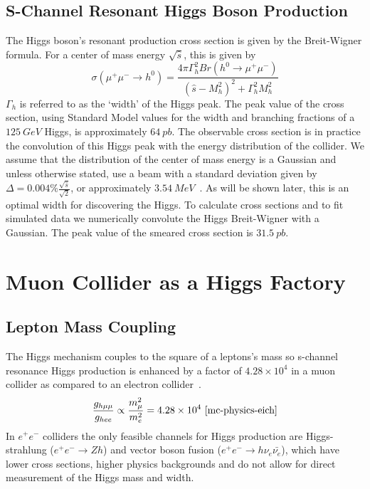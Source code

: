 \documentclass[a4paper]{article}
\begin{document}
\subsection{S-Channel Resonant Higgs Boson Production}
The Higgs boson's resonant production cross section is given by the Breit-Wigner formula. For a center of mass energy $\sqrt{\hat{s}}$, this is given by~\cite{han-higgs-measurement}
\begin{equation}
	\sigma(\mu^+\mu^- \rightarrow h^0) = \frac{4\pi \Gamma_h^2 Br(h^0\rightarrow \mu^+\mu^-)}{{(\hat{s} - M_h^2)}^2 + \Gamma_h^2 M_h^2}\label{eq:higgs-bw}
\end{equation}
$\Gamma_h$ is referred to as the `width' of the Higgs peak. The peak value of the cross section, using Standard Model values for the width and branching fractions of a $125~GeV$ Higgs, is approximately $64~pb$. The observable cross section is in practice the convolution of this Higgs peak with the energy distribution of the collider. We assume that the distribution of the center of mass energy is a Gaussian and unless otherwise stated, use a beam with a standard deviation given by $\Delta = 0.004\%\frac{\sqrt{\hat{s}}}{\sqrt{2}}$, or approximately $3.54~MeV$~\cite{han-higgs-measurement,map-whitepaper}. As will be shown later, this is an optimal width for discovering the Higgs. To calculate cross sections and to fit simulated data we numerically convolute the Higgs Breit-Wigner with a Gaussian. The peak value of the smeared cross section is $31.5~pb$.

\section{Muon Collider as a Higgs Factory}

	\subsection{Lepton Mass Coupling}
	The Higgs mechanism couples to the square of a leptons's mass so s-channel resonance Higgs production is enhanced by a factor of $4.28\times 10^4$ in a muon collider as compared to an electron collider~\cite{mc-physics-eich}.
\begin{equation}
	\frac{g_{h\mu\mu}}{g_{hee}} \propto \frac{m_{\mu}^2}{m_e^2} = 4.28\times 10^4~\cite{mc-physics-eich}
\label{lepton-coupling}
\end{equation}
In $e^+e^-$ colliders the only feasible channels for Higgs production are Higgs-strahlung ($e^+e^-\rightarrow Zh$) and vector boson fusion ($e^+e^-\rightarrow h\nu_e\bar{\nu_e}$), which have lower cross sections, higher physics backgrounds and do not allow for direct measurement of the Higgs mass and width.
\end{document}
